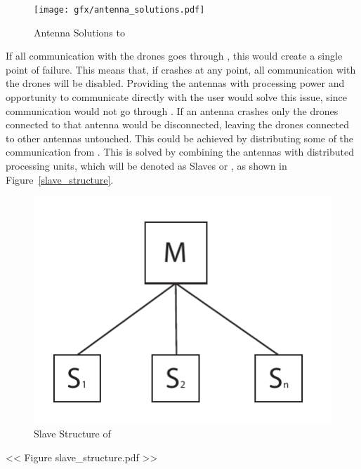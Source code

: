 \begin{figure}[htb]
    \centering
    \texttt{[image: gfx/antenna\_solutions.pdf]}
    \caption{Antenna Solutions to \projectname{}}
    \label{fig:antenna_solutions}
\end{figure}

If all communication with the drones goes through , this would create a single point of failure. This means that, if  crashes at any point, all communication with the drones will be disabled. Providing the antennas with processing power and opportunity to communicate directly with the user would solve this issue, since communication would not go through . If an antenna crashes only the drones connected to that antenna would be disconnected, leaving the drones connected to other antennas untouched. This could be achieved by distributing some of the communication from . This is solved by combining the antennas with distributed processing units, which will be denoted as Slaves or , as shown in Figure~\ref{slave_structure}.

\begin{figure}[htb]
    \centering
    \includegraphics[width=\textwidth]{gfx/slave_structure.pdf}
    \caption{Slave Structure of \projectname{}}
    \label{fig:slave_structure}
\end{figure}
<< Figure slave_structure.pdf >>


